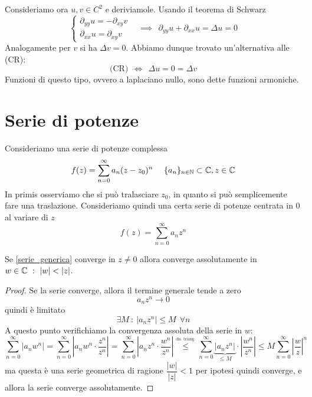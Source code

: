 Consideriamo ora $u, v\in C^{2}$ e deriviamole. Usando il teorema di Schwarz
\begin{equation*}
\begin{cases}
\partial_{yy} u = - \partial_{xy} v\ \ \ \ \\
\partial_{xx} u = \partial_{xy} v
\end{cases} \implies \ \ \partial_{yy} u + \partial_{xx} u = \Delta u = 0
\end{equation*}
Analogamente per $v$ si ha $\Delta v = 0$. Abbiamo dunque trovato un'alternativa alle (CR):
$$
\text{(CR)} \ \ \iff \ \ \Delta u = 0 = \Delta v
$$
Funzioni di questo tipo, ovvero a laplaciano nullo, sono dette funzioni armoniche.

\section{Serie di potenze}

Consideriamo una serie di potenze complessa
\begin{equation*}
f(z) = \sum\limits^{\infty}_{n = 0} a_{n}(z - z_{0})^{n} \ \ \ \ \{a_{n}\}_{n\in\mathbb{N}} \subset \mathbb{C}, z\in \mathbb{C}
\end{equation*}
In primis osserviamo che si può tralasciare $z_{0}$, in quanto si può semplicemente fare una traslazione. Consideriamo quindi una certa serie di potenze centrata in $0$ al variare di $z$
\begin{equation}
\label{serie_generica}
f(z) = \sum\limits^{\infty}_{n = 0} a_{n} z^{n}
\end{equation}

\begin{thm}
Se \eqref{serie_generica} converge in $z \neq 0$ allora converge assolutamente in $w\in\CC\ :\ |w|<|z|$.
\end{thm}


\begin{proof}
Se la serie converge, allora il termine generale tende a zero
\begin{equation*}
a_{n} z^{n}\rightarrow 0
\end{equation*}
quindi è limitato
\begin{equation*}
\exists M\ :\ \left| a_{n} z^{n}\right| \leq M\ \ \forall n
\end{equation*}
A questo punto verifichiamo la convergenza assoluta della serie in $w$:
\begin{equation*}
\sum\limits^{\infty}_{n = 0}\left| a_{n} w^{n}\right| = \sum\limits^{\infty}_{n = 0} \left|a_{n} w^{n} \cdot \frac{z^n}{z^n} \right| = \sum\limits^{\infty}_{n = 0} \left|a_{n} z^{n} \cdot \frac{w^n}{z^n} \right| \overset{\underset{\text{dis. triang.}}{}}{\leq} \sum\limits^{\infty}_{n = 0}\underbrace{\left| a_{n} z^{n}\right|}_{\leq M}\cdot \left|\frac{w^n}{z^n}\right| \leq M\sum\limits^{\infty}_{n = 0}\left|\frac{w}{z}\right|^n
\end{equation*}
ma questa è una serie geometrica di ragione $\dfrac{| w|}{| z|} < 1$ per ipotesi quindi converge, e allora la serie converge assolutamente. 
\end{proof}


